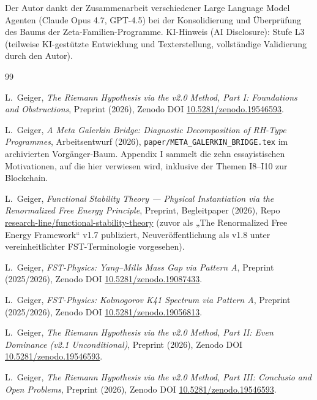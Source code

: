 \documentclass[11pt]{article}
\theoremstyle{definition}
\theoremstyle{remark}
\begin{document}
Der Autor dankt der Zusammenarbeit verschiedener Large Language Model
Agenten (Claude Opus 4.7, GPT-4.5) bei der Konsolidierung und Überprüfung des
Baums der Zeta-Familien-Programme.
KI-Hinweis (AI Disclosure): Stufe L3 (teilweise KI-gestützte Entwicklung und Texterstellung, vollständige Validierung durch den Autor).

\begin{thebibliography}{99}


L.~Geiger, \emph{The Riemann Hypothesis via the v2.0 Method,
Part I: Foundations and Obstructions}, Preprint (2026), Zenodo DOI
\href{https://doi.org/10.5281/zenodo.19546593}{10.5281/zenodo.19546593}.

L.~Geiger, \emph{A Meta Galerkin Bridge: Diagnostic Decomposition
of RH-Type Programmes}, Arbeitsentwurf (2026),
\texttt{paper/META\_GALERKIN\_BRIDGE.tex} im archivierten Vorgänger-Baum. Appendix I sammelt
die zehn essayistischen Motivationen, auf die hier verwiesen wird, inklusive der
Themen I8--I10 zur Blockchain.

L.~Geiger, \emph{Functional Stability Theory --- Physical
Instantiation via the Renormalized Free Energy Principle},
Preprint, Begleitpaper (2026), Repo
\href{https://github.com/research-line/functional-stability-theory}{research-line/functional-stability-theory}
(zuvor als „The Renormalized Free Energy Framework“
v1.7 publiziert, Neuveröffentlichung als v1.8 unter vereinheitlichter FST-Terminologie vorgesehen).

L.~Geiger, \emph{FST-Physics: Yang--Mills Mass Gap via Pattern A},
Preprint (2025/2026), Zenodo DOI
\href{https://doi.org/10.5281/zenodo.19087433}{10.5281/zenodo.19087433}.

L.~Geiger, \emph{FST-Physics: Kolmogorov K41 Spectrum via
Pattern A}, Preprint (2025/2026), Zenodo DOI
\href{https://doi.org/10.5281/zenodo.19056813}{10.5281/zenodo.19056813}.

L.~Geiger, \emph{The Riemann Hypothesis via the v2.0 Method,
Part II: Even Dominance (v2.1 Unconditional)}, Preprint (2026),
Zenodo DOI
\href{https://doi.org/10.5281/zenodo.19546593}{10.5281/zenodo.19546593}.

L.~Geiger, \emph{The Riemann Hypothesis via the v2.0 Method,
Part III: Conclusio and Open Problems}, Preprint (2026),
Zenodo DOI
\href{https://doi.org/10.5281/zenodo.19546593}{10.5281/zenodo.19546593}.


\end{thebibliography}
\end{document}
